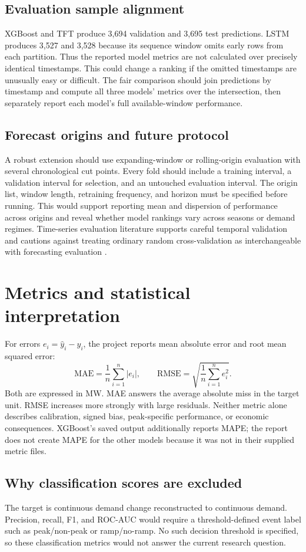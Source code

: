 \documentclass[12pt,a4paper]{article}
\begin{document}
\subsection{Evaluation sample alignment}
XGBoost and TFT produce 3,694 validation and 3,695 test predictions. LSTM produces 3,527 and 3,528 because its sequence window omits early rows from each partition. Thus the reported model metrics are not calculated over precisely identical timestamps. This could change a ranking if the omitted timestamps are unusually easy or difficult. The fair comparison should join predictions by timestamp and compute all three models' metrics over the intersection, then separately report each model's full available-window performance.

\subsection{Forecast origins and future protocol}
A robust extension should use expanding-window or rolling-origin evaluation with several chronological cut points. Every fold should include a training interval, a validation interval for selection, and an untouched evaluation interval. The origin list, window length, retraining frequency, and horizon must be specified before running. This would support reporting mean and dispersion of performance across origins and reveal whether model rankings vary across seasons or demand regimes. Time-series evaluation literature supports careful temporal validation and cautions against treating ordinary random cross-validation as interchangeable with forecasting evaluation \cite{bergmeir2012}.

\newpage
\section{Metrics and statistical interpretation}
For errors $e_i=\hat y_i-y_i$, the project reports mean absolute error and root mean squared error:
\[
\mathrm{MAE}=\frac{1}{n}\sum_{i=1}^{n}|e_i|,\qquad
\mathrm{RMSE}=\sqrt{\frac{1}{n}\sum_{i=1}^{n}e_i^2}.
\]
Both are expressed in MW. MAE answers the average absolute miss in the target unit. RMSE increases more strongly with large residuals. Neither metric alone describes calibration, signed bias, peak-specific performance, or economic consequences. XGBoost's saved output additionally reports MAPE; the report does not create MAPE for the other models because it was not in their supplied metric files.

\subsection{Why classification scores are excluded}
The target is continuous demand change reconstructed to continuous demand. Precision, recall, F1, and ROC-AUC would require a threshold-defined event label such as peak/non-peak or ramp/no-ramp. No such decision threshold is specified, so these classification metrics would not answer the current research question.
\end{document}
